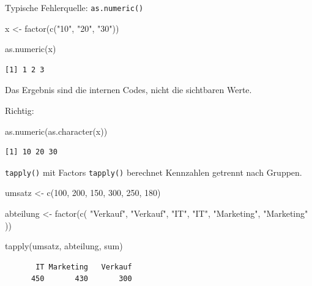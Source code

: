 \documentclass[
  10pt,
  ignorenonframetext,
  aspectratio=169,
]{beamer}
\newenvironment{Shaded}{}{}
\newcommand{\DecValTok}[1]{\textcolor[rgb]{0.25,0.63,0.44}{#1}}
\newcommand{\FunctionTok}[1]{\textcolor[rgb]{0.02,0.16,0.49}{#1}}
\newcommand{\NormalTok}[1]{#1}
\newcommand{\OtherTok}[1]{\textcolor[rgb]{0.00,0.44,0.13}{#1}}
\newcommand{\StringTok}[1]{\textcolor[rgb]{0.25,0.44,0.63}{#1}}
\begin{document}
\begin{frame}[fragile]{Typische Fehlerquelle: \texttt{as.numeric()}}
\label{typische-fehlerquelle-as.numeric}
\begin{Shaded}
\begin{Highlighting}[]
\NormalTok{x }\OtherTok{\textless{}{-}} \FunctionTok{factor}\NormalTok{(}\FunctionTok{c}\NormalTok{(}\StringTok{"10"}\NormalTok{, }\StringTok{"20"}\NormalTok{, }\StringTok{"30"}\NormalTok{))}

\FunctionTok{as.numeric}\NormalTok{(x)}
\end{Highlighting}
\end{Shaded}

\begin{verbatim}
[1] 1 2 3
\end{verbatim}

Das Ergebnis sind die internen Codes, nicht die sichtbaren Werte.

Richtig:

\begin{Shaded}
\begin{Highlighting}[]
\FunctionTok{as.numeric}\NormalTok{(}\FunctionTok{as.character}\NormalTok{(x))}
\end{Highlighting}
\end{Shaded}

\begin{verbatim}
[1] 10 20 30
\end{verbatim}
\end{frame}

\begin{frame}[fragile]{\texttt{tapply()} mit Factors}
\label{tapply-mit-factors}
\texttt{tapply()} berechnet Kennzahlen getrennt nach Gruppen.

\begin{Shaded}
\begin{Highlighting}[]
\NormalTok{umsatz }\OtherTok{\textless{}{-}} \FunctionTok{c}\NormalTok{(}\DecValTok{100}\NormalTok{, }\DecValTok{200}\NormalTok{, }\DecValTok{150}\NormalTok{, }\DecValTok{300}\NormalTok{, }\DecValTok{250}\NormalTok{, }\DecValTok{180}\NormalTok{)}

\NormalTok{abteilung }\OtherTok{\textless{}{-}} \FunctionTok{factor}\NormalTok{(}\FunctionTok{c}\NormalTok{(}
  \StringTok{"Verkauf"}\NormalTok{, }\StringTok{"Verkauf"}\NormalTok{, }\StringTok{"IT"}\NormalTok{,}
  \StringTok{"IT"}\NormalTok{, }\StringTok{"Marketing"}\NormalTok{, }\StringTok{"Marketing"}
\NormalTok{))}

\FunctionTok{tapply}\NormalTok{(umsatz, abteilung, sum)}
\end{Highlighting}
\end{Shaded}

\begin{verbatim}
       IT Marketing   Verkauf 
      450       430       300 
\end{verbatim}
\end{frame}
\end{document}
